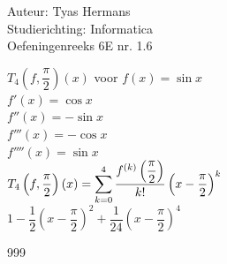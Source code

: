 \documentclass[a4paper]{article}
\begin{document}
  
\noindent \large Auteur: Tyas Hermans \\
\noindent \large Studierichting: Informatica\\
\noindent \large Oefeningenreeks 6E nr. 1.6\\

\medskip

\normalsize

$T_4\left(f,\dfrac{\pi}{2}\right)(x)$ voor $f(x) = \sin x$\\

$f'(x) = \cos x$\\

$f''(x) = -\sin x$\\

$f'''(x) = -\cos x$\\

$f''''(x) = \sin x$\\

$T_4\left(f,\dfrac{\pi}{2}\right)(x) = \displaystyle\sum^{4}_{k=0}\limits\dfrac{f^{(k)}\left(\dfrac{\pi}{2}\right)}{k!}\left(x-\dfrac{\pi}{2}\right)^k$\\

$1-\dfrac{1}{2}\left(x-\dfrac{\pi}{2}\right)^2+\dfrac{1}{24}\left(x-\dfrac{\pi}{2}\right)^4$\\



\begin{thebibliography}{999}
\end{thebibliography}
\end{document}
